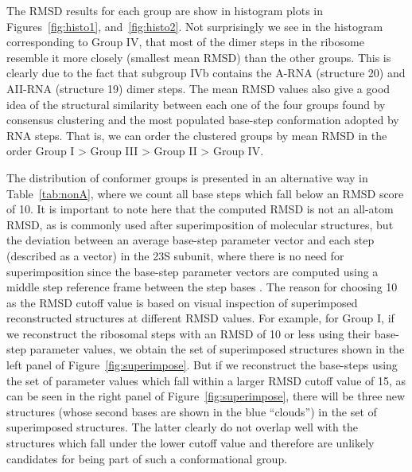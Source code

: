 The  RMSD  results for  each  group are  show  in  histogram plots  in
Figures~\ref{fig:histo1},  and~\ref{fig:histo2}.  Not  surprisingly we
see in the histogram corresponding to Group IV, that most of the dimer
steps in  the ribosome resemble  it more closely (smallest  mean RMSD)
than the other  groups. This is clearly due to  the fact that subgroup
IVb contains the A-RNA (structure 20) and AII-RNA (structure 19) dimer
steps.  The mean  RMSD values also give a good  idea of the structural
similarity  between each  one of  the four  groups found  by consensus
clustering and  the most  populated base-step conformation  adopted by
RNA steps. That is, we can  order the clustered groups by mean RMSD in
the order Group I > Group III > Group II > Group IV.

The distribution  of conformer groups  is presented in  an alternative
way in Table~\ref{tab:nonA}, where we  count all base steps which fall
below an  RMSD score  of 10.  It  is important  to note here  that the
computed  RMSD is  not an  all-atom RMSD,  as is  commonly  used after
superimposition of molecular structures,  but the deviation between an
average  base-step parameter  vector  and each  step  (described as  a
vector) in the 23S subunit, where there is no need for superimposition
since the base-step parameter vectors are computed using a middle step
reference frame between the  step bases \cite{lu2003}.  The reason for
choosing 10 as the RMSD cutoff  value is based on visual inspection of
superimposed  reconstructed structures at  different RMSD  values. For
example, for  Group I, if we  reconstruct the ribosomal  steps with an
RMSD of 10  or less using their base-step  parameter values, we obtain
the  set  of  superimposed  structures  shown in  the  left  panel  of
Figure~\ref{fig:superimpose}.   But if  we reconstruct  the base-steps
using  the set of  parameter values  which fall  within a  larger RMSD
cutoff  value  of   15,  as  can  be  seen  in   the  right  panel  of
Figure~\ref{fig:superimpose},  there  will  be  three  new  structures
(whose second  bases are shown in  the blue ``clouds'') in  the set of
superimposed structures.  The latter clearly do not  overlap well with
the structures which  fall under the lower cutoff  value and therefore
are unlikely candidates for being part of such a conformational group.
  
